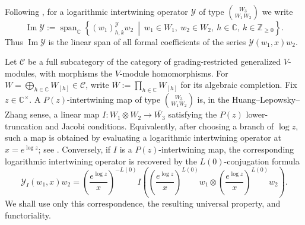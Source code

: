 \documentclass[10pt,a4paper]{amsart}
\numberwithin{equation}{section} \newtheorem{thm}{Theorem}[section] \newtheorem{lem}[thm]{Lemma} \newtheorem{ex}[thm]{Example} \newtheorem{prop}[thm]{Proposition} \newtheorem{cor}[thm]{Corollary} \newtheorem{defi}[thm]{Definition} \newtheorem{rmk}[thm]{Remark} \newtheorem{notation}[thm]{Notation}
\def\Z{\mathbb{Z}} \def\N{\mathbb{N}} \def\A{\mathbb{A}} \def\C{\mathbb{C}} \def\R{\mathbb{R}} \def\Q{\mathbb{Q}} \def\F{\mathbb{F}}
\begin{document}
Following \cite[\S2]{CMY}, for a logarithmic intertwining operator $\mathcal Y$ of type $\binom{W_3}{W_1\,W_2}$ we write
\[
\operatorname{Im}\mathcal Y
:=
\operatorname{span}_{\C}
\left\{
(w_1)^{\mathcal Y}_{h,k}w_2
\ \middle|\
w_1\in W_1,\ w_2\in W_2,\ h\in\C,\ k\in\Z_{\ge0}
\right\}.
\]
Thus $\operatorname{Im}\mathcal Y$ is the linear span of all formal coefficients of the series $\mathcal Y(w_1,x)w_2$.

Let $\mathcal C$ be a full subcategory of the category of grading-restricted generalized $V$-modules, with morphisms the $V$-module homomorphisms. For \(W=\bigoplus_{h\in\C}W_{[h]}\in\mathcal C\), write \(\overline W:=\prod_{h\in\C}W_{[h]}\) for its algebraic completion. Fix $z\in\C^\times$. A $P(z)$-intertwining map of type \(\binom{W_3}{W_1 W_2}\) is, in the Huang--Lepowsky--Zhang sense, a linear map \(I:W_1\otimes W_2\longrightarrow\overline{W_3}\) satisfying the $P(z)$ lower-truncation and Jacobi conditions. Equivalently, after choosing a branch of $\log z$, such a map is obtained by evaluating a logarithmic intertwining operator at $x=e^{\log z}$; see \cite[\S2.1]{McRae}. Conversely, if $I$ is a $P(z)$-intertwining map, the corresponding logarithmic intertwining operator is recovered by the $L(0)$-conjugation formula
\begin{equation}\label{eq:Pz-inverse}
\mathcal Y_I(w_1,x)w_2
=
\left(\frac{e^{\log z}}{x}\right)^{-L(0)}
I\left(
\left(\frac{e^{\log z}}{x}\right)^{L(0)}w_1
\otimes
\left(\frac{e^{\log z}}{x}\right)^{L(0)}w_2
\right).
\end{equation}
We shall use only this correspondence, the resulting universal property, and functoriality.
\end{document}
